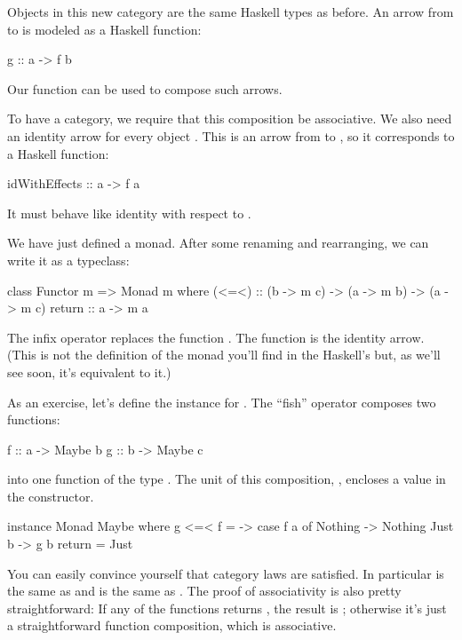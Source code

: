 \documentclass[DaoFP]{subfiles}
\begin{document}
Objects in this new category are the same Haskell types as before. An arrow from  to  is modeled as a Haskell function:
\begin{haskell}
g :: a -> f b
\end{haskell}
Our function  can be used to compose such arrows. 

To have a category, we require that this composition be associative. We also need an identity arrow for every object . This is an arrow from  to , so it corresponds to a Haskell function:
\begin{haskell}
idWithEffects :: a -> f a
\end{haskell}
It must behave like identity with respect to .

We have just defined a monad. After some renaming and rearranging, we can write it as a typeclass:
\begin{haskell}
class Functor m => Monad m where
  (<=<) :: (b -> m c) -> (a -> m b) -> (a -> m c)
  return :: a -> m a
\end{haskell}
The infix operator \hask{<=<} replaces the function . The  function is the identity arrow. (This is not the definition of the monad you'll find in the Haskell's  but, as we'll see soon, it's equivalent to it.)

As an exercise, let's define the  instance for . The ``fish'' operator \hask{<=<} composes two functions:
\begin{haskell}
f :: a -> Maybe b
g :: b -> Maybe c
\end{haskell}
into one function of the type . The unit of this composition, , encloses a value in the  constructor.
\begin{haskell}
instance Monad Maybe where
  g <=< f = \a -> case f a of
                    Nothing -> Nothing
                    Just b -> g b
  return = Just  
\end{haskell}

You can easily convince yourself that category laws are satisfied. In particular  is the same as  and  is the same as . The proof of associativity is also pretty straightforward: If any of the functions returns , the result is ; otherwise it's just a straightforward function composition, which is associative.
\end{document}
